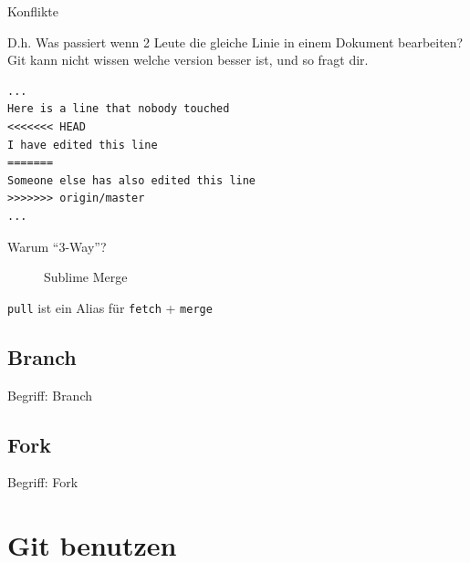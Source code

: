\begin{frame}[fragile]{Konflikte}
	\begin{block}{}
	D.h. Was passiert wenn 2 Leute die gleiche Linie in einem Dokument bearbeiten?
	\\
	\pause
	\vspace{1em}
	Git kann nicht wissen welche version besser ist, und so fragt dir.
	\end{block}
	\begin{verbatim}
...
Here is a line that nobody touched
<<<<<<< HEAD
I have edited this line
=======
Someone else has also edited this line
>>>>>>> origin/master
...\end{verbatim}
\end{frame}
\begin{frame}{Warum ``3-Way''?}
	\begin{center}
	\begin{figure}
	\caption{Sublime Merge}
	\end{figure}
	\end{center}

	\pause
	\begin{center}
	\Large
	\texttt{pull} ist ein Alias f\"ur \texttt{fetch} + \texttt{merge}
	\end{center}
\end{frame}

\subsection{Branch}
\begin{frame}{Begriff: Branch}
\end{frame}

\subsection{Fork}
\begin{frame}{Begriff: Fork}
\end{frame}

\section{Git benutzen}



